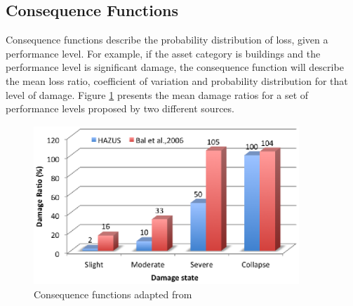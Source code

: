 \subsection{Consequence Functions}
Consequence functions describe the probability distribution of loss, given a performance level. For example, if the asset category is buildings and the performance level is significant damage, the consequence function will describe the mean loss ratio, coefficient of variation and probability distribution for that level of damage. Figure \ref{fig:ConsequenceFunctions} presents the mean damage ratios for a set of performance levels proposed by two different sources. 

\begin{figure}[Ht]
\centering
\includegraphics[width=10cm,height=6cm]{./Figures/Part_Risk/ConsequenceFunction.eps}
\caption{Consequence functions adapted from  \citet{Baletal2010}}
\label{fig:ConsequenceFunctions}
\end{figure}

